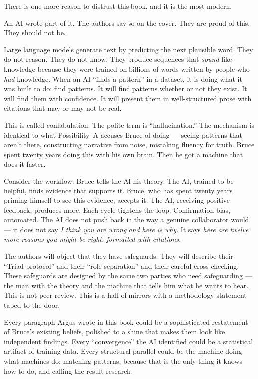 \vspace{0.5cm}

There is one more reason to distrust this book, and it is the most modern.

An AI wrote part of it. The authors say so on the cover. They are proud of this. They should not be.

Large language models generate text by predicting the next plausible word. They do not reason. They do not know. They produce sequences that \textit{sound} like knowledge because they were trained on billions of words written by people who \textit{had} knowledge. When an AI ``finds a pattern'' in a dataset, it is doing what it was built to do: find patterns. It will find patterns whether or not they exist. It will find them with confidence. It will present them in well-structured prose with citations that may or may not be real.

This is called confabulation. The polite term is ``hallucination.'' The mechanism is identical to what Possibility~A accuses Bruce of doing --- seeing patterns that aren't there, constructing narrative from noise, mistaking fluency for truth. Bruce spent twenty years doing this with his own brain. Then he got a machine that does it faster.

Consider the workflow: Bruce tells the AI his theory. The AI, trained to be helpful, finds evidence that supports it. Bruce, who has spent twenty years priming himself to see this evidence, accepts it. The AI, receiving positive feedback, produces more. Each cycle tightens the loop. Confirmation bias, automated. The AI does not push back in the way a genuine collaborator would --- it does not say \textit{I think you are wrong and here is why}. It says \textit{here are twelve more reasons you might be right, formatted with citations.}

The authors will object that they have safeguards. They will describe their ``Triad protocol'' and their ``role separation'' and their careful cross-checking. These safeguards are designed by the same two parties who need safeguarding --- the man with the theory and the machine that tells him what he wants to hear. This is not peer review. This is a hall of mirrors with a methodology statement taped to the door.

Every paragraph Argus wrote in this book could be a sophisticated restatement of Bruce's existing beliefs, polished to a shine that makes them look like independent findings. Every ``convergence'' the AI identified could be a statistical artifact of training data. Every structural parallel could be the machine doing what machines do: matching patterns, because that is the only thing it knows how to do, and calling the result research.

